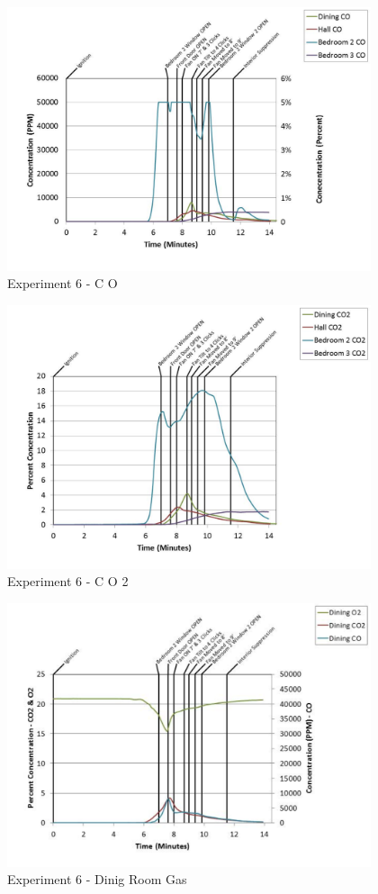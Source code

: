 \documentclass{article}
\begin{document}
\begin{appendices}
	\begin{figure}[h!]
		\centering
		\includegraphics[height=3.05in]{0_Images/Results_Charts/Exp_6_Charts/CO.pdf}
		\caption{Experiment 6 - C O}
	\end{figure}
 
	\clearpage

	\begin{figure}[h!]
		\centering
		\includegraphics[height=3.05in]{0_Images/Results_Charts/Exp_6_Charts/CO2.pdf}
		\caption{Experiment 6 - C O 2}
	\end{figure}
 

	\begin{figure}[h!]
		\centering
		\includegraphics[height=3.05in]{0_Images/Results_Charts/Exp_6_Charts/DinigRoomGas.pdf}
		\caption{Experiment 6 - Dinig Room Gas}
	\end{figure}
 

\end{appendices}
\end{document}
